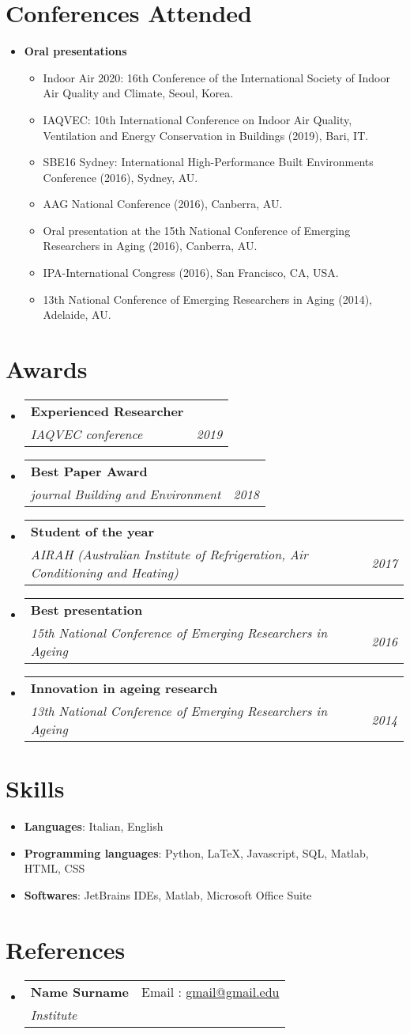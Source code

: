 \documentclass[a4paper,11pt]{article}
\makeatletter
\newcommand{\resumeItemPaper}[1]{
    \item\small{
            {#1}
    }
}
\newcommand{\resumeSubheading}[4]{
    \vspace{-1pt}\item
    \begin{tabular*}{0.97\textwidth}{l@{\extracolsep{\fill}}r}
        \textbf{#1}       & #2                 \\
        \textit{\small#3} & \textit{\small #4} \\
    \end{tabular*}\vspace{-5pt}
}
\newcommand{\resumeSubHeadingListStart}{\begin{itemize}[leftmargin=*]}
\newcommand{\resumeSubHeadingListEnd}{\end{itemize}}
\newcommand{\resumeItemListStart}{\begin{itemize}}
\newcommand{\resumeItemListEnd}{\end{itemize}\vspace{-5pt}}
\makeatother
\begin{document}
\section{Conferences Attended}
\resumeSubHeadingListStart
\item{
\textbf{Oral presentations}
\resumeItemListStart
\resumeItemPaper{Indoor Air 2020: 16th Conference of the International Society of Indoor Air Quality and Climate, Seoul, Korea.}
\resumeItemPaper{IAQVEC: 10th International Conference on Indoor Air Quality, Ventilation and Energy Conservation in Buildings (2019), Bari, IT.}
\resumeItemPaper{SBE16 Sydney: International High-Performance Built Environments Conference (2016), Sydney, AU.}
\resumeItemPaper{AAG National Conference (2016), Canberra, AU.}
\resumeItemPaper{Oral presentation at the 15th National Conference of Emerging Researchers in Aging (2016), Canberra, AU.}
\resumeItemPaper{IPA-International Congress (2016), San Francisco, CA, USA.}
\resumeItemPaper{13th National Conference of Emerging Researchers in Aging (2014), Adelaide, AU.}
\resumeItemListEnd
}
\resumeSubHeadingListEnd

\section{Awards}
\resumeSubHeadingListStart

\resumeSubheading
{Experienced Researcher}{}
{IAQVEC conference}{2019}

\resumeSubheading
{Best Paper Award}{}
{journal Building and Environment}{2018}

\resumeSubheading
{Student of the year}{}
{AIRAH (Australian Institute of Refrigeration, Air Conditioning and Heating)}{2017}

\resumeSubheading
{Best presentation}{}
{15th National Conference of Emerging Researchers in Ageing}{2016}

\resumeSubheading
{Innovation in ageing research}{}
{13th National Conference of Emerging Researchers in Ageing}{2014}

\resumeSubHeadingListEnd

\section{Skills}
\resumeSubHeadingListStart
\item{ \textbf{Languages}{: Italian, English} }
\item{ \textbf{Programming languages}{: Python, \LaTeX, Javascript, SQL, Matlab, HTML, CSS} }
\item{ \textbf{Softwares}{: JetBrains IDEs, Matlab, Microsoft Office Suite} }
\resumeSubHeadingListEnd

\section{References}
\resumeSubHeadingListStart

\resumeSubheading
{Name Surname}{Email : \href{gmail@gmail.edu}{gmail@gmail.edu}}
{Institute}{}

\resumeSubHeadingListEnd

\end{document}
